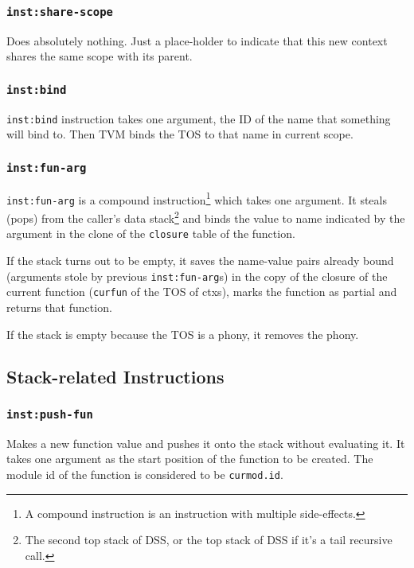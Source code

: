\documentclass{article}
\newcommand{\inst}[1] {\texttt{inst:#1}}
\begin{document}
\subsubsection{\inst{share-scope}}

Does absolutely nothing. Just a place-holder to indicate that this new context shares the same scope with its parent.

\subsubsection{\inst{bind}}

\inst{bind} instruction takes one argument, the ID of the name that something will bind to. Then TVM binds the TOS to that name in current scope.

\subsubsection{\inst{fun-arg}}

\inst{fun-arg} is a compound instruction\footnote{A compound instruction is an instruction with multiple side-effects.} which takes one argument. It steals (pops) from the caller's data stack\footnote{The second top stack of DSS, or the top stack of DSS if it's a tail recursive call.} and binds the value to name indicated by the argument in the clone of the \texttt{closure} table of the function.

If the stack turns out to be empty, it saves the name-value pairs already bound (arguments stole by previous \inst{fun-arg}s) in the copy of the closure of the current function (\texttt{curfun} of the TOS of ctxs), marks the function as partial and returns that function.

If the stack is empty because the TOS is a phony, it removes the phony.

\subsection{Stack-related Instructions}

\subsubsection{\inst{push-fun}}

Makes a new function value and pushes it onto the stack without evaluating it. It takes one argument as the start position of the function to be created. The module id of the function is considered to be \texttt{curmod.id}.
\end{document}
